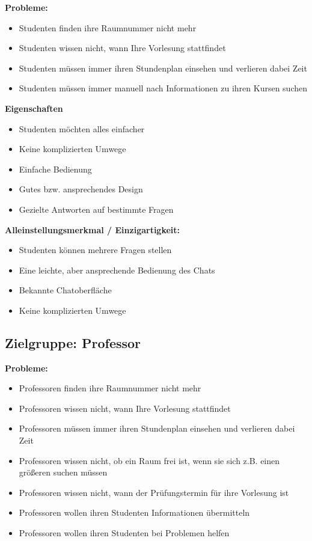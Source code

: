 \textbf{Probleme:}
\begin{itemize}
    \item Studenten finden ihre Raumnummer nicht mehr
    \item Studenten wissen nicht, wann Ihre Vorlesung stattfindet
    \item Studenten müssen immer ihren Stundenplan einsehen und verlieren dabei Zeit 
    \item Studenten müssen immer manuell nach Informationen zu ihren Kursen suchen
\end{itemize}
\medskip

\textbf{Eigenschaften}
\begin{itemize}
    \item Studenten möchten alles einfacher
    \item Keine komplizierten Umwege
    \item Einfache Bedienung
    \item Gutes bzw. ansprechendes Design
    \item Gezielte Antworten auf bestimmte Fragen
\end{itemize}
\medskip

\textbf{Alleinstellungsmerkmal / Einzigartigkeit:}
\begin{itemize}
    \item Studenten können mehrere Fragen stellen
    \item Eine leichte, aber ansprechende Bedienung des Chats
    \item Bekannte Chatoberfläche
    \item Keine komplizierten Umwege 
\end{itemize}

\subsection{Zielgruppe: Professor}

\textbf{Probleme:}
\begin{itemize}
    \item Professoren finden ihre Raumnummer nicht mehr
    \item Professoren wissen nicht, wann Ihre Vorlesung stattfindet
    \item Professoren müssen immer ihren Stundenplan einsehen und verlieren dabei Zeit
    \item Professoren wissen nicht, ob ein Raum frei ist, wenn sie sich z.B. einen größeren suchen müssen
    \item Professoren wissen nicht, wann der Prüfungstermin für ihre Vorlesung ist
    \item Professoren wollen ihren Studenten Informationen übermitteln
    \item Professoren wollen ihren Studenten bei Problemen helfen
\end{itemize}
\medskip

